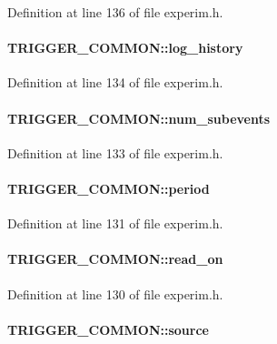 Definition at line 136 of file experim.h.
\paragraph[{log\_\-history}]{ {\bf TRIGGER\_\-COMMON::log\_\-history}}\hfill\label{structTRIGGER__COMMON_abd629267aa937ba84def9fbb64b44d21}


Definition at line 134 of file experim.h.
\paragraph[{num\_\-subevents}]{ {\bf TRIGGER\_\-COMMON::num\_\-subevents}}\hfill\label{structTRIGGER__COMMON_a3edb2d647866d934a686e90c615f158b}


Definition at line 133 of file experim.h.
\paragraph[{period}]{ {\bf TRIGGER\_\-COMMON::period}}\hfill\label{structTRIGGER__COMMON_a85ff9445806063f7a318ee1ba0af2cba}


Definition at line 131 of file experim.h.
\paragraph[{read\_\-on}]{ {\bf TRIGGER\_\-COMMON::read\_\-on}}\hfill\label{structTRIGGER__COMMON_a081ee9f9bbcbdc4e0a85162d6363fb45}


Definition at line 130 of file experim.h.
\paragraph[{source}]{ {\bf TRIGGER\_\-COMMON::source}}\hfill\label{structTRIGGER__COMMON_a0f5ee88cc5e0c622279c684e02838ebb}


